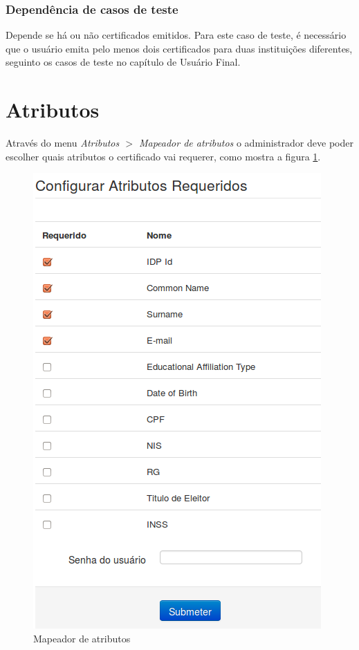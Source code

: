 \subsubsection{Dependência de casos de teste}
Depende se há ou não certificados emitidos. Para este caso de teste, é necessário que o usuário emita pelo menos dois certificados para duas instituições diferentes, seguinto os casos de teste no capítulo de Usuário Final.

\section{Atributos}

Através do menu \textit{Atributos $>$ Mapeador de atributos} o administrador deve poder escolher quais atributos o certificado vai requerer, como mostra a figura \ref{fig:atmap}.

\begin{figure}[ht]
     \centering
     \includegraphics[scale=0.6]{images/attributesmapper.png}
     \caption{Mapeador de atributos}
     \label{fig:atmap}
\end{figure}

